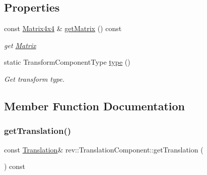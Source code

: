\subsection*{Properties}
\begin{DoxyCompactItemize}
\item 
\mbox{\label{classrev_1_1_translation_component_aeab70dc26867a6192e6d8949627e414b}} 
const \mbox{\hyperlink{classrev_1_1_square_matrix}{Matrix4x4}} \& \mbox{\hyperlink{classrev_1_1_translation_component_aeab70dc26867a6192e6d8949627e414b}{get\+Matrix}} () const
\begin{DoxyCompactList}\small\item\em get \mbox{\hyperlink{classrev_1_1_matrix}{Matrix}} \end{DoxyCompactList}\item 
\mbox{\label{classrev_1_1_translation_component_af206fd745797923b7db6bd24b92e5a7d}} 
static Transform\+Component\+Type \mbox{\hyperlink{classrev_1_1_translation_component_af206fd745797923b7db6bd24b92e5a7d}{type}} ()
\begin{DoxyCompactList}\small\item\em Get transform type. \end{DoxyCompactList}\end{DoxyCompactItemize}


\subsection{Member Function Documentation}
\mbox{\label{classrev_1_1_translation_component_a3447ac0f8cbe55e414c97736d06b44ea}} 
\subsubsection{\texorpdfstring{getTranslation()}{getTranslation()}}
{\footnotesize\ttfamily const \mbox{\hyperlink{structrev_1_1_translation}{Translation}}\& rev\+::\+Translation\+Component\+::get\+Translation (\begin{DoxyParamCaption}{ }\end{DoxyParamCaption}) const\hspace{0.3cm}{\ttfamily [inline]}}



